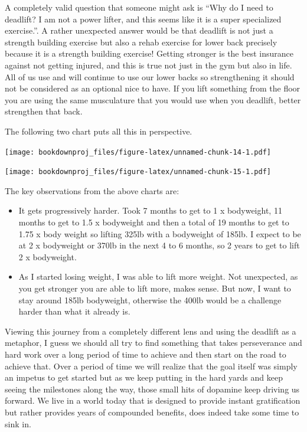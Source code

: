 \documentclass[
  oneside]{book}
\begin{document}
A completely valid question that someone might ask is ``Why do I need to deadlift? I am not a power lifter, and this seems like it is a super specialized exercise.''. A rather unexpected answer would be that deadlift is not just a strength building exercise but also a rehab exercise for lower back precisely because it is a strength building exercise! Getting stronger is the best insurance against not getting injured, and this is true not just in the gym but also in life. All of us use and will continue to use our lower backs so strengthening it should not be considered as an optional nice to have. If you lift something from the floor you are using the same musculature that you would use when you deadlift, better strengthen that back.

The following two chart puts all this in perspective.

\texttt{[image: bookdownproj\_files/figure-latex/unnamed-chunk-14-1.pdf]}

\texttt{[image: bookdownproj\_files/figure-latex/unnamed-chunk-15-1.pdf]}

The key observations from the above charts are:

\begin{itemize}
\item
  It gets progressively harder. Took 7 months to get to 1 x bodyweight, 11 months to get to 1.5 x bodyweight and then a total of 19 months to get to 1.75 x body weight so lifting 325lb with a bodyweight of 185lb. I expect to be at 2 x bodyweight or 370lb in the next 4 to 6 months, so 2 years to get to lift 2 x bodyweight.
\item
  As I started losing weight, I was able to lift more weight. Not unexpected, as you get stronger you are able to lift more, makes sense. But now, I want to stay around 185lb bodyweight, otherwise the 400lb would be a challenge harder than what it already is.
\end{itemize}

Viewing this journey from a completely different lens and using the deadlift as a metaphor, I guess we should all try to find something that takes perseverance and hard work over a long period of time to achieve and then start on the road to achieve that. Over a period of time we will realize that the goal itself was simply an impetus to get started but as we keep putting in the hard yards and keep seeing the milestones along the way, those small hits of dopamine keep driving us forward. We live in a world today that is designed to provide instant gratification but rather provides years of compounded benefits, does indeed take some time to sink in.
\end{document}
